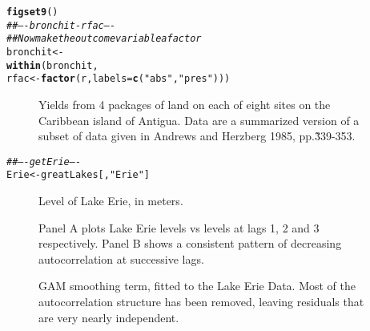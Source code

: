 \documentclass[12pt, a4paper,  BCOR=8.25mm, DIV=15]{scrartcl}\usepackage[]{graphicx}\usepackage[]{color}
\makeatletter
\newcommand{\hlstr}[1]{\textcolor[rgb]{0.192,0.494,0.8}{#1}}%
\newcommand{\hlcom}[1]{\textcolor[rgb]{0.678,0.584,0.686}{\textit{#1}}}%
\newcommand{\hlstd}[1]{\textcolor[rgb]{0.345,0.345,0.345}{#1}}%
\newcommand{\hlkwb}[1]{\textcolor[rgb]{0.69,0.353,0.396}{#1}}%
\newcommand{\hlkwc}[1]{\textcolor[rgb]{0.333,0.667,0.333}{#1}}%
\newcommand{\hlkwd}[1]{\textcolor[rgb]{0.737,0.353,0.396}{\textbf{#1}}}%
\newenvironment{kframe}{%
 \def\at@end@of@kframe{}%
 \ifinner\ifhmode%
  \def\at@end@of@kframe{\end{minipage}}%
  \begin{minipage}{\columnwidth}%
 \fi\fi%
 \def\FrameCommand##1{\hskip\@totalleftmargin \hskip-\fboxsep
 \colorbox{shadecolor}{##1}\hskip-\fboxsep
     \hskip-\linewidth \hskip-\@totalleftmargin \hskip\columnwidth}%
 \MakeFramed {\advance\hsize-\width
   \@totalleftmargin\z@ \linewidth\hsize
   \@setminipage}}%
 {\par\unskip\endMakeFramed%
 \at@end@of@kframe}
\newenvironment{knitrout}{}{} %
\makeatother
\begin{document}
\begin{knitrout}
\color{fgcolor}\begin{kframe}
\begin{alltt}
\hlkwd{figset9}\hlstd{()}
  \hlcom{## ---- bronchit-rfac ----}
\hlcom{## Now make the outcome variable a factor}
\hlstd{bronchit} \hlkwb{<-}
  \hlkwd{within}\hlstd{(bronchit,}
         \hlstd{rfac} \hlkwb{<-} \hlkwd{factor}\hlstd{(r,} \hlkwc{labels}\hlstd{=}\hlkwd{c}\hlstd{(}\hlstr{"abs"}\hlstd{,}\hlstr{"pres"}\hlstd{)))}
\end{alltt}
\end{kframe}
\end{knitrout}

\begin{figure}

\caption{Yields from 4 packages of land on each of eight sites on the
  Caribbean island of Antigua. Data are a summarized version of a
  subset of data given in Andrews and Herzberg 1985,
  pp.\~339-353.\label{fig:caribbean}}
\end{figure}

\begin{knitrout}
\color{fgcolor}\begin{kframe}
\begin{alltt}
\hlcom{## ---- getErie ----}
\hlstd{Erie} \hlkwb{<-} \hlstd{greatLakes[,}\hlstr{"Erie"}\hlstd{]}
\end{alltt}
\end{kframe}
\end{knitrout}

\begin{figure}

\caption{Level of Lake Erie, in meters.
}\label{fig:erie}
\end{figure}

\begin{figure}

\vspace*{-3pt}


\caption{Panel A plots Lake Erie levels vs levels at lags 1, 2 and 3
  respectively. Panel B shows a consistent pattern of decreasing
  autocorrelation at successive lags.
}\label{erie-lagplot}
\end{figure}

\begin{figure}

\caption{GAM smoothing term, fitted to the Lake Erie Data.
    Most of the autocorrelation structure has been
    removed, leaving residuals that are very nearly independent.
  }\label{lh-smoothplot}
\end{figure}
\end{document}
